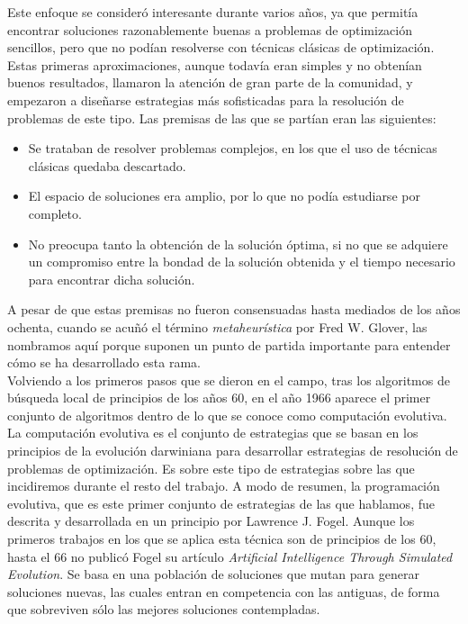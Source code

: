 \documentclass[12pt]{article} \usepackage[utf8]{inputenc}
\begin{document}
Este enfoque se consideró interesante durante varios años, ya que
permitía encontrar soluciones razonablemente buenas a problemas de
optimización sencillos, pero que no podían resolverse con técnicas
clásicas de optimización.\\

Estas primeras aproximaciones, aunque todavía eran simples y no
obtenían buenos resultados, llamaron la atención de gran parte de la
comunidad, y empezaron a diseñarse estrategias más sofisticadas para
la resolución de problemas de este tipo. Las premisas de las que se
partían eran las siguientes:

\begin{itemize}
\item Se trataban de resolver problemas complejos, en los que el uso
  de técnicas clásicas quedaba descartado.
\item El espacio de soluciones era amplio, por lo que no podía
  estudiarse por completo.
\item No preocupa tanto la obtención de la solución óptima, si no que
  se adquiere un compromiso entre la bondad de la solución obtenida y
  el tiempo necesario para encontrar dicha solución.
\end{itemize}

A pesar de que estas premisas no fueron consensuadas hasta mediados de
los años ochenta, cuando se acuñó el término \textit{metaheurística}
por Fred W. Glover, las nombramos aquí porque suponen un punto de
partida importante para entender cómo se ha desarrollado esta rama.\\

Volviendo a los primeros pasos que se dieron en el campo, tras los
algoritmos de búsqueda local de principios de los años 60, en el año
1966 aparece el primer conjunto de algoritmos dentro de lo que se
conoce como computación evolutiva. La computación evolutiva es el
conjunto de estrategias que se basan en los principios de la evolución
darwiniana para desarrollar estrategias de resolución de problemas de
optimización. Es sobre este tipo de estrategias sobre las que
incidiremos durante el resto del trabajo. A modo de resumen, la
programación evolutiva, que es este primer conjunto de estrategias de
las que hablamos, fue descrita y desarrollada en un principio por
Lawrence J. Fogel. Aunque los primeros trabajos en los que se aplica
esta técnica son de principios de los 60, hasta el 66 no publicó Fogel
su artículo \textit{Artificial Intelligence Through Simulated
  Evolution}.  Se basa en una población de soluciones que mutan para
generar soluciones nuevas, las cuales entran en competencia con las
antiguas, de forma que sobreviven sólo las mejores soluciones
contempladas.\\
\end{document}
